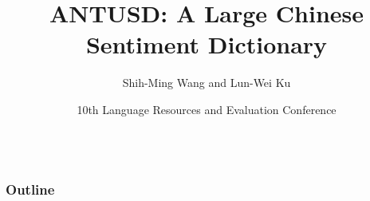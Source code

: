 \documentclass[compress]{beamer}
\title{ANTUSD: A Large Chinese Sentiment Dictionary }
\author{Shih-Ming Wang and Lun-Wei Ku}
\date[LREC 2016]{10th Language Resources and Evaluation Conference}
\begin{document}
\beamertemplatenavigationsymbolsempty


{
%

\begin{frame}{\secname}
    \begin{columns}[T]
        \begin{column}[T]{.3\textwidth}
        \end{column}
        \begin{column}[T]{.7\textwidth}
            \vspace{.5cm}
            \maketitle
        \end{column}
    \end{columns}
\end{frame}
}

\begin{frame}
    \frametitle{Outline}
    \tableofcontents %
\end{frame}
\end{document}
